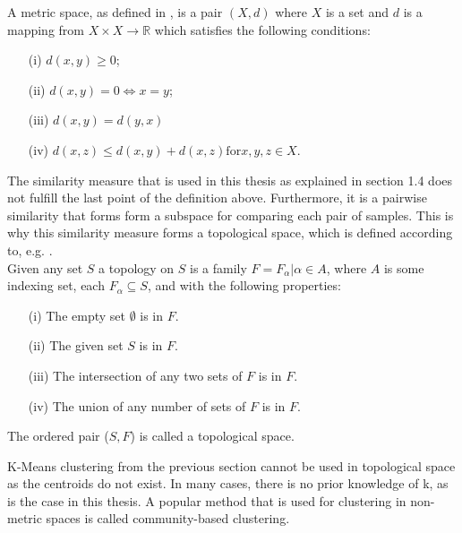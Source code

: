 \documentclass[thesis=B,english]{FITthesis}[2012/10/20]
\begin{document}
A metric space, as defined in \cite{choudhary1992elements}, is a pair $(X, d)$ where $X$ is a set and $d$ is a mapping from  $X \times X \to \mathbb{R}$ which satisfies the following conditions:
\begin{enumerate}
    \item [(i)] $d(x, y) \geq 0$;
    \item [(ii)] $d(x, y) = 0 \iff x = y$;
    \item [(iii)] $d(x, y) = d(y, x)$
    \item [(iv)] $d(x, z) \leq d(x, y) + d(x, z) \mathrm{for} x, y, z \in X$.
\end{enumerate}

The similarity measure that is used in this thesis as explained in section 1.4  does not fulfill the last point of the definition above. Furthermore, it is a pairwise similarity that forms form a subspace for comparing each pair of samples.
This is why this similarity measure forms a topological space, which is defined according to, e.g. \cite{stahl2014introduction}. \\

Given any set $S$ a topology on $S$ is a family $F ={F_{\alpha} | \alpha \in A}$, where $A$ is some indexing set, each $F_{\alpha}  \subseteq S$, and with the following properties:
\begin{enumerate}
    \item [(i)] The empty set $\emptyset$ is in $F$.
    \item [(ii)] The given set $S$ is in $F$.
    \item [(iii)] The intersection of any two sets of $F$ is in $F$.
    \item [(iv)] The union of any number of sets of $F$ is in $F$.
\end{enumerate}
The ordered pair ($S, F$) is called a topological space. \\


K-Means clustering from the previous section cannot be used in topological space as the centroids do not exist.
In many cases, there is no prior knowledge of k, as is the case in this thesis.
A popular method that is used for clustering in non-metric spaces is called community-based clustering. \\
\end{document}
